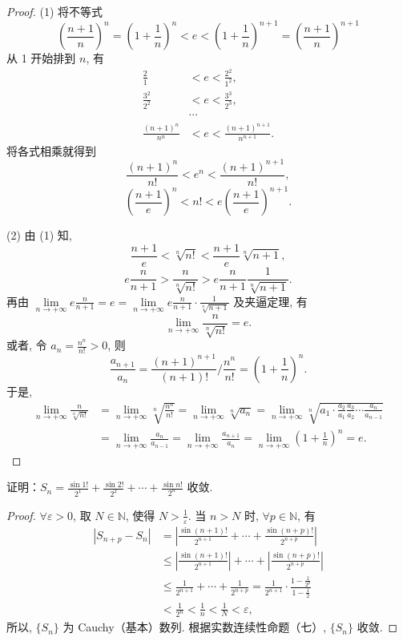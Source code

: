 \begin{proof}
(1) 将不等式
\[
\left(\frac{n+1}{n}\right)^{n} = \left(1 + \frac{1}{n}\right)^{n} < e < \left(1 + \frac{1}{n}\right)^{n+1} = \left(\frac{n+1}{n}\right)^{n+1}
\]
从 1 开始排到 $n$, 有
\[
\begin{aligned}
\frac{2}{1} &< e < \frac{2^2}{1^2}, \\
\frac{3^2}{2^2} &< e < \frac{3^3}{2^3}, \\
&\cdots \\
\frac{(n+1)^n}{n^n} &< e < \frac{(n+1)^{n+1}}{n^{n+1}}.
\end{aligned}
\]
将各式相乘就得到
\[
\frac{(n+1)^{n}}{n!} < e^{n} < \frac{(n+1)^{n+1}}{n!},
\]
\[
\left(\frac{n+1}{e}\right)^{n} < n! < e\left(\frac{n+1}{e}\right)^{n+1}.
\]

(2) 由 (1) 知,
\[
\frac{n+1}{e} < \sqrt[n]{n!} < \frac{n+1}{e}\sqrt[n]{n+1},
\]
\[
e\frac{n}{n+1} > \frac{n}{\sqrt[n]{n!}} > e\frac{n}{n+1}\frac{1}{\sqrt[n]{n+1}}.
\]
再由 $\lim\limits_{n\to+\infty} e\frac{n}{n+1} = e = \lim\limits_{n\to+\infty} e\frac{n}{n+1}\cdot\frac{1}{\sqrt[n]{n+1}}$ 及夹逼定理, 有
\[
\lim_{n\to+\infty}\frac{n}{\sqrt[n]{n!}} = e.
\]
或者, 令 $a_{n} = \frac{n^{n}}{n!} > 0$, 则
\[
\frac{a_{n+1}}{a_{n}} = \frac{(n+1)^{n+1}}{(n+1)!}\bigg/\frac{n^{n}}{n!} = \left(1 + \frac{1}{n}\right)^{n}.
\]
于是,
\[
\begin{aligned}
\lim_{n\to+\infty}\frac{n}{\sqrt[n]{n!}} &= \lim_{n\to+\infty}\sqrt[n]{\frac{n^n}{n!}} = \lim_{n\to+\infty}\sqrt[n]{a_n} = \lim_{n\to+\infty}\sqrt[n]{a_1\cdot\frac{a_2}{a_1}\frac{a_3}{a_2}\cdots\frac{a_n}{a_{n-1}}} \\
&= \lim_{n\to+\infty}\frac{a_n}{a_{n-1}} = \lim_{n\to+\infty}\frac{a_{n+1}}{a_n} = \lim_{n\to+\infty}\left(1 + \frac{1}{n}\right)^n = e.
\end{aligned}
\]
\end{proof}

\begin{example}\label{ex:1.4.12}
证明：$S_{n} = \frac{\sin 1!}{2^{1}} + \frac{\sin 2!}{2^{2}} + \cdots + \frac{\sin n!}{2^{n}}$ 收敛.
\end{example}

\begin{proof}
$\forall\varepsilon>0$, 取 $N\in\mathbb{N}$, 使得 $N > \frac{1}{\varepsilon}$. 当 $n>N$ 时, $\forall p\in\mathbb{N}$, 有
\[
\begin{aligned}
|S_{n+p} - S_n| &= \left|\frac{\sin(n+1)!}{2^{n+1}} + \cdots + \frac{\sin(n+p)!}{2^{n+p}}\right| \\
&\leqslant \left|\frac{\sin(n+1)!}{2^{n+1}}\right| + \cdots + \left|\frac{\sin(n+p)!}{2^{n+p}}\right| \\
&\leqslant \frac{1}{2^{n+1}} + \cdots + \frac{1}{2^{n+p}} = \frac{1}{2^{n+1}}\cdot\frac{1 - \frac{1}{2^{p}}}{1 - \frac{1}{2}} \\
&< \frac{1}{2^n} < \frac{1}{n} < \frac{1}{N} < \varepsilon,
\end{aligned}
\]
所以, $\{S_{n}\}$ 为 Cauchy（基本）数列. 根据实数连续性命题（七）, $\{S_{n}\}$ 收敛.
\end{proof}

